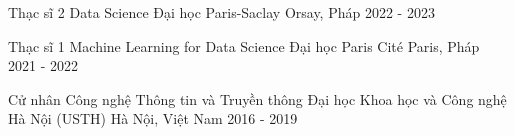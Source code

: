 

\begin{cventries}
\renewcommand*{\acvPositionCase}[1]{#1} %

  \cventry
    {Thạc sĩ 2 Data Science} %
    {Đại học Paris-Saclay} %
    {Orsay, Pháp} %
    {2022 - 2023} %
    {}

  \cventry
    {Thạc sĩ 1 Machine Learning for Data Science} %
    {Đại học Paris Cité} %
    {Paris, Pháp} %
    {2021 - 2022} %
    {}

  \cventry
    {Cử nhân Công nghệ Thông tin và Truyền thông} %
    {Đại học Khoa học và Công nghệ Hà Nội (USTH)} %
    {Hà Nội, Việt Nam} %
    {2016 - 2019} %
    {}

\end{cventries}
